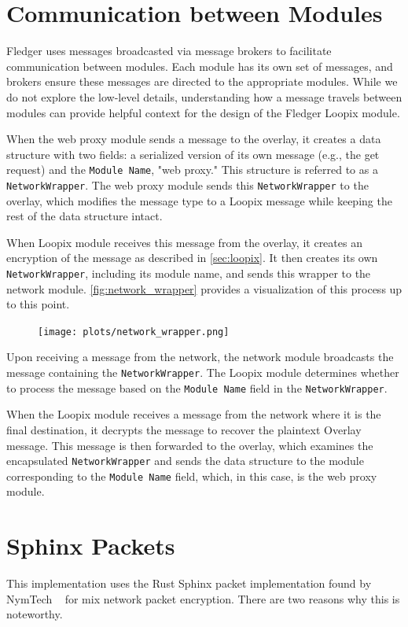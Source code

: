 \documentclass[a4paper,11pt,oneside]{report}
\begin{document}
\section{Communication between Modules}
Fledger uses messages broadcasted via message brokers to facilitate communication between modules. Each module has its own set of messages, and brokers ensure these messages are directed to the appropriate modules. While we do not explore the low-level details, understanding how a message travels between modules can provide helpful context for the design of the Fledger Loopix module.

When the web proxy module sends a message to the overlay, it creates a data structure with two fields: a serialized version of its own message (e.g., the get request) and the \texttt{Module Name}, "web proxy." This structure is referred to as a \texttt{NetworkWrapper}. The web proxy module sends this \texttt{NetworkWrapper} to the overlay, which modifies the message type to a Loopix message while keeping the rest of the data structure intact.

When Loopix module receives this message from the overlay, it creates an encryption of the message as described in \autoref{sec:loopix}. It then creates its own \texttt{NetworkWrapper}, including its module name, and sends this wrapper to the network module. \autoref{fig:network_wrapper} provides a visualization of this process up to this point.

\begin{figure}[H]
    \centering
    \texttt{[image: plots/network\_wrapper.png]}
    \caption{}
    \label{fig:network_wrapper}
\end{figure}

Upon receiving a message from the network, the network module broadcasts the message containing the \texttt{NetworkWrapper}. The Loopix module determines whether to process the message based on the \texttt{Module Name} field in the \texttt{NetworkWrapper}.

When the Loopix module receives a message from the network where it is the final destination, it decrypts the message to recover the plaintext Overlay message. This message is then forwarded to the overlay, which examines the encapsulated \texttt{NetworkWrapper} and sends the data structure to the module corresponding to the \texttt{Module Name} field, which, in this case, is the web proxy module.

\section{Sphinx Packets}
\label{sec:sphinx}
This implementation uses the Rust Sphinx packet implementation found by NymTech ~\cite{nymtech-sphinx} for mix network packet encryption. There are two reasons why this is noteworthy.
\end{document}
